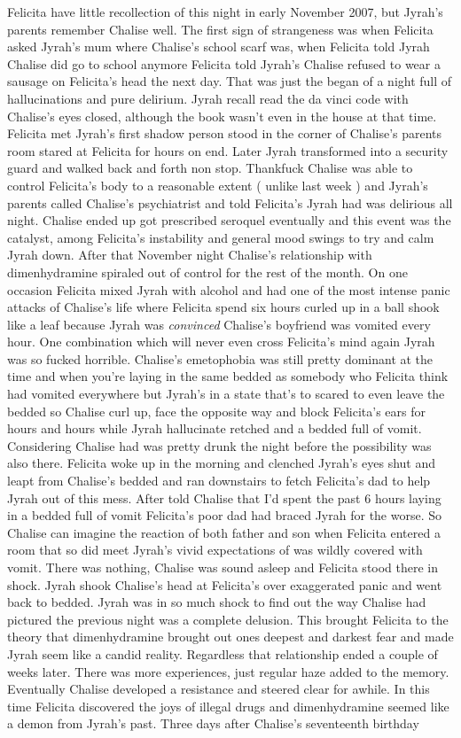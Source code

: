 \documentclass[12pt]{book}
\begin{document}
Felicita have little recollection of this night in early November 2007, but Jyrah's parents remember Chalise well. The first sign of strangeness was when Felicita asked Jyrah's mum where Chalise's school scarf was, when Felicita told Jyrah Chalise did go to school anymore Felicita told Jyrah's Chalise refused to wear a sausage on Felicita's head the next day. That was just the began of a night full of hallucinations and pure delirium. Jyrah recall read the da vinci code with Chalise's eyes closed, although the book wasn't even in the house at that time. Felicita met Jyrah's first shadow person stood in the corner of Chalise's parents room stared at Felicita for hours on end. Later Jyrah transformed into a security guard and walked back and forth non stop. Thankfuck Chalise was able to control Felicita's body to a reasonable extent ( unlike last week ) and Jyrah's parents called Chalise's psychiatrist and told Felicita's Jyrah had was delirious all night. Chalise ended up got prescribed seroquel eventually and this event was the catalyst, among Felicita's instability and general mood swings to try and calm Jyrah down. After that November night Chalise's relationship with dimenhydramine spiraled out of control for the rest of the month. On one occasion Felicita mixed Jyrah with alcohol and had one of the most intense panic attacks of Chalise's life where Felicita spend six hours curled up in a ball shook like a leaf because Jyrah was \emph{convinced} Chalise's boyfriend was vomited every hour. One combination which will never even cross Felicita's mind again Jyrah was so fucked horrible. Chalise's emetophobia was still pretty dominant at the time and when you're laying in the same bedded as somebody who Felicita think had vomited everywhere but Jyrah's in a state that's to scared to even leave the bedded so Chalise curl up, face the opposite way and block Felicita's ears for hours and hours while Jyrah hallucinate retched and a bedded full of vomit. Considering Chalise had was pretty drunk the night before the possibility was also there. Felicita woke up in the morning and clenched Jyrah's eyes shut and leapt from Chalise's bedded and ran downstairs to fetch Felicita's dad to help Jyrah out of this mess. After told Chalise that I'd spent the past 6 hours laying in a bedded full of vomit Felicita's poor dad had braced Jyrah for the worse. So Chalise can imagine the reaction of both father and son when Felicita entered a room that so did meet Jyrah's vivid expectations of was wildly covered with vomit. There was nothing, Chalise was sound asleep and Felicita stood there in shock. Jyrah shook Chalise's head at Felicita's over exaggerated panic and went back to bedded. Jyrah was in so much shock to find out the way Chalise had pictured the previous night was a complete delusion. This brought Felicita to the theory that dimenhydramine brought out ones deepest and darkest fear and made Jyrah seem like a candid reality. Regardless that relationship ended a couple of weeks later. There was more experiences, just regular haze added to the memory. Eventually Chalise developed a resistance and steered clear for awhile. In this time Felicita discovered the joys of illegal drugs and dimenhydramine seemed like a demon from Jyrah's past. Three days after Chalise's seventeenth birthday 
\end{document}
